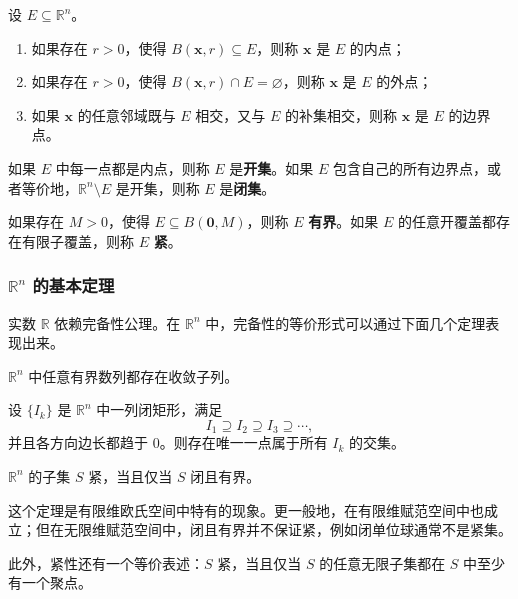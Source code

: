 \begin{definition}[内点、外点与边界点]
设 $E\subseteq\mathbb{R}^n$。
\begin{enumerate}
    \item 如果存在 $r>0$，使得 $B(\mathbf{x},r)\subseteq E$，则称 $\mathbf{x}$ 是 $E$ 的内点；
    \item 如果存在 $r>0$，使得 $B(\mathbf{x},r)\cap E=\varnothing$，则称 $\mathbf{x}$ 是 $E$ 的外点；
    \item 如果 $\mathbf{x}$ 的任意邻域既与 $E$ 相交，又与 $E$ 的补集相交，则称 $\mathbf{x}$ 是 $E$ 的边界点。
\end{enumerate}
\end{definition}

\begin{definition}[开集与闭集]
如果 $E$ 中每一点都是内点，则称 $E$ 是\textbf{开集}。如果 $E$ 包含自己的所有边界点，或者等价地，$\mathbb{R}^n\setminus E$ 是开集，则称 $E$ 是\textbf{闭集}。
\end{definition}

\begin{definition}[有界集与紧集]
如果存在 $M>0$，使得 $E\subseteq B(\mathbf{0},M)$，则称 $E$ \textbf{有界}。如果 $E$ 的任意开覆盖都存在有限子覆盖，则称 $E$ \textbf{紧}。
\end{definition}

\subsubsection{\texorpdfstring{$\mathbb{R}^n$}{R^n} 的基本定理}

实数 $\mathbb{R}$ 依赖完备性公理。在 $\mathbb{R}^n$ 中，完备性的等价形式可以通过下面几个定理表现出来。

\begin{theorem}
$\mathbb{R}^n$ 中任意有界数列都存在收敛子列。
\end{theorem}

\begin{theorem}[闭矩形套定理]
设 $\{I_k\}$ 是 $\mathbb{R}^n$ 中一列闭矩形，满足
\[
    I_1\supseteq I_2\supseteq I_3\supseteq\cdots,
\]
并且各方向边长都趋于 $0$。则存在唯一一点属于所有 $I_k$ 的交集。
\end{theorem}

\begin{theorem}
$\mathbb{R}^n$ 的子集 $S$ 紧，当且仅当 $S$ 闭且有界。
\end{theorem}

\begin{remark}
这个定理是有限维欧氏空间中特有的现象。更一般地，在有限维赋范空间中也成立；但在无限维赋范空间中，闭且有界并不保证紧，例如闭单位球通常不是紧集。

此外，紧性还有一个等价表述：$S$ 紧，当且仅当 $S$ 的任意无限子集都在 $S$ 中至少有一个聚点。
\end{remark}

